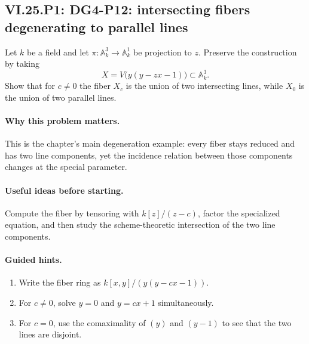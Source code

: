 \subsection*{VI.25.P1: DG4-P12: intersecting fibers degenerating to parallel lines}
\begin{problem}\label{prob:vi25-p01}
Let \(k\) be a field and let \(\pi:\mathbb A^3_k\to\mathbb A^1_k\) be projection to \(z\).  Preserve the construction by taking
\[
X=V\bigl(y(y-zx-1)\bigr)\subset\mathbb A^3_k.
\]
Show that for \(c\ne0\) the fiber \(X_c\) is the union of two intersecting lines, while \(X_0\) is the union of two parallel lines.
\end{problem}

\ifdefined\FullProblemDossiers
\paragraph{Why this problem matters.}
This is the chapter's main degeneration example: every fiber stays reduced and has two line components, yet the incidence relation between those components changes at the special parameter.

\paragraph{Useful ideas before starting.}
Compute the fiber by tensoring with \(k[z]/(z-c)\), factor the specialized equation, and then study the scheme-theoretic intersection of the two line components.

\paragraph{Guided hints.}
\begin{enumerate}
\item Write the fiber ring as \(k[x,y]/(y(y-cx-1))\).
\item For \(c\ne0\), solve \(y=0\) and \(y=cx+1\) simultaneously.
\item For \(c=0\), use the comaximality of \((y)\) and \((y-1)\) to see that the two lines are disjoint.
\end{enumerate}

